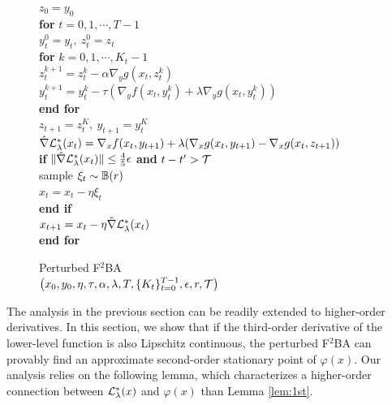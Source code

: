 \documentclass{article}
\begin{document}
\begin{figure}
\begin{minipage}{0.48\textwidth}
\vskip -0.8cm
\begin{algorithm}[H]  
\caption{Perturbed F${}^2$BA \\ $\left(x_0,y_0, \eta,\tau,\alpha, \lambda, T,\{K_t\}_{t=0}^{T-1}, \epsilon,r ,{\mathcal{T}} \right)$} \label{alg:PF2BA}
\begin{algorithmic}[1] 
\STATE $ z_0 = y_0$ \\[1mm]
\STATE \textbf{for} $ t =0,1,\cdots,T-1 $ \\[1mm]
\STATE \quad $ y_t^0 =  y_{t}, ~ z_t^0 = z_{t}$ \\[1mm]
\STATE \quad \textbf{for} $ k =0,1,\cdots,K_t-1$ \\[1mm]
\STATE \quad \quad $ z_t^{k+1} = z_t^{k}- \alpha \nabla_y g(x_t, z_t^k)   $ \\[1mm]
\STATE \quad \quad $ y_t^{k+1} = y_t^k - \tau \left( \nabla_y f(x_t,y_t^k) +  \lambda  \nabla_y g(x_t,y_t^k) \right)$ \\[1mm]
\STATE \quad \textbf{end for} \\[1mm]
\STATE \quad $z_{t+1} = z_t^K,~ y_{t+1} = y_t^K $ \\[1mm]
\STATE \quad $ \hat \nabla {\mathcal{L}}_{\lambda}^*(x_t)= \nabla_x f(x_t,y_{t+1}) + \lambda ( \nabla_x g(x_t,y_{t+1}) - \nabla_x g(x_t,z_{t+1}) )$ \\[1mm]
\STATE \quad \textbf{if} $ \Vert \hat \nabla {\mathcal{L}}_{\lambda}^*(x_t) \Vert \le \frac{4}{5} \epsilon$ \textbf{and} $t - t' > {\mathcal{T}}  $ \\[1mm]
\STATE \quad \quad sample $\xi_t \sim {\mathbb{B}}(r)$ \\[1mm]
\STATE \quad \quad $x_{t} = x_t - \eta \xi_t $ \\[1mm]
\STATE \quad \textbf{end if} \\[1mm]
\STATE \quad $x_{t+1} = x_t -  \eta  \hat \nabla {\mathcal{L}}_{\lambda}^*(x_t)$ \\[1mm]
\STATE \textbf{end for} \\[1mm]
\end{algorithmic}
\end{algorithm}
\end{minipage}
\vskip -0.8cm
\end{figure}

The analysis in the previous section can be readily extended to higher-order derivatives.
In this section, we show that if the third-order derivative of the lower-level function is also Lipschitz continuous, the perturbed F${}^2$BA  can provably find an approximate second-order stationary point of $\varphi(x)$. Our analysis relies on the following lemma, which characterizes a higher-order connection between  ${\mathcal{L}}_{\lambda}^*(x)$ and $\varphi(x)$ than Lemma \ref{lem:1st}.
\end{document}
